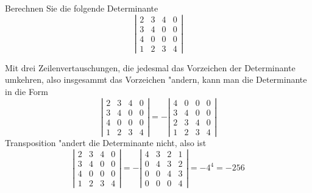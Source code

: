 Berechnen Sie die folgende Determinante
\[
\left|
\begin{matrix}
2&3&4&0\\
3&4&0&0\\
4&0&0&0\\
1&2&3&4
\end{matrix}
\right|
\]

\begin{loesung}
Mit drei Zeilenvertauschungen, die jedesmal das Vorzeichen der
Determinante umkehren, also insgesammt das Vorzeichen "andern,
kann man die Determinante in die Form
\[
\left|
\begin{matrix}
2&3&4&0\\
3&4&0&0\\
4&0&0&0\\
1&2&3&4
\end{matrix}
\right|
=
-\left|
\begin{matrix}
4&0&0&0\\
3&4&0&0\\
2&3&4&0\\
1&2&3&4
\end{matrix}
\right|
\]
Transposition "andert die Determinante nicht, also ist
\[
\left|
\begin{matrix}
2&3&4&0\\
3&4&0&0\\
4&0&0&0\\
1&2&3&4
\end{matrix}
\right|
=
-\left|
\begin{matrix}
4&3&2&1\\
0&4&3&2\\
0&0&4&3\\
0&0&0&4
\end{matrix}
\right|=-4^4=-256
\]
\end{loesung}

